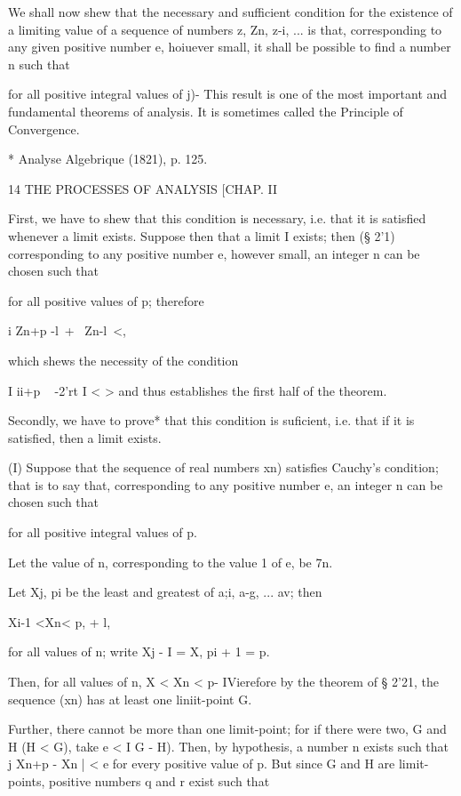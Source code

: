 We shall now shew that the necessary and sufficient condition for the
existence of a limiting value of a sequence of numbers z, Zn, z-i,
... is that, corresponding to any given positive number e, hoiuever
small, it shall be possible to find a number n such that

for all positive integral values of j)- This result is one of the most
important and fundamental theorems of analysis. It is sometimes called
the Principle of Convergence.

* Analyse Algebrique (1821), p. 125.



14 THE PROCESSES OF ANALYSIS [CHAP. II

First, we have to shew that this condition is necessary, i.e. that it
is satisfied whenever a limit exists. Suppose then that a limit I
exists; then (§ 2'1) corresponding to any positive number e, however
small, an integer n can be chosen such that

for all positive values of p; therefore

  i Zn+p -l\ + \ Zn-l\ <,

which shews the necessity of the condition

I ii+p ~ -2'rt I < > and thus establishes the first half of the
theorem.

Secondly, we have to prove* that this condition is suficient, i.e.
that if it is satisfied, then a limit exists.

(I) Suppose that the sequence of real numbers xn) satisfies Cauchy's
condition; that is to say that, corresponding to any positive number
e, an integer n can be chosen such that

for all positive integral values of p.

Let the value of n, corresponding to the value 1 of e, be 7n.

Let Xj, pi be the least and greatest of a;i, a-g, ... av; then

Xi-1 <Xn< p, + l,

for all values of n; write Xj - I = X, pi + 1 = p.

Then, for all values of n, X < Xn < p- IVierefore by the theorem of §
2'21, the sequence (xn) has at least one liniit-point G.

Further, there cannot be more than one limit-point; for if there were
two, G and H (H < G), take e < I G - H). Then, by hypothesis, a number
n exists such that j Xn+p - Xn | < e for every positive value of p.
But since G and H are limit-points, positive numbers q and r exist
such that

